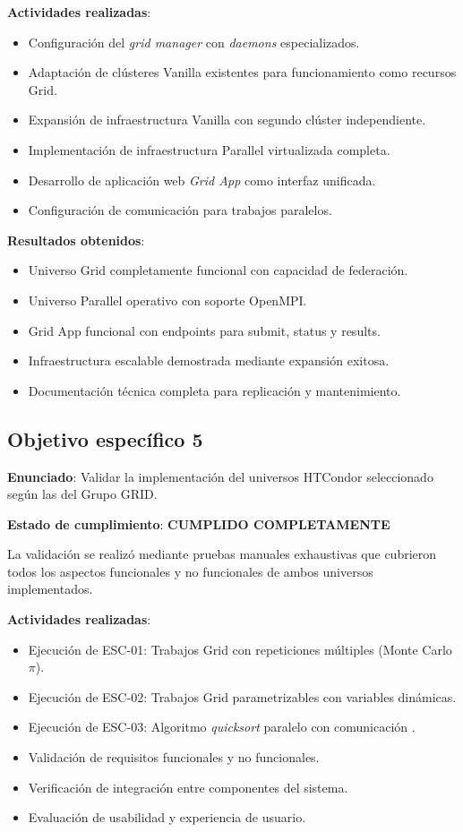 \textbf{Actividades realizadas}:
\begin{itemize}
    \item Configuración del \textit{grid manager} con \textit{daemons} especializados.
    \item Adaptación de clústeres Vanilla existentes para funcionamiento como recursos Grid.
    \item Expansión de infraestructura Vanilla con segundo clúster independiente.
    \item Implementación de infraestructura Parallel virtualizada completa.
    \item Desarrollo de aplicación web \textit{Grid App} como interfaz unificada.
    \item Configuración de comunicación \MPI para trabajos paralelos.
\end{itemize}

\textbf{Resultados obtenidos}:
\begin{itemize}
    \item Universo Grid completamente funcional con capacidad de federación.
    \item Universo Parallel operativo con soporte OpenMPI.
    \item Grid App funcional con endpoints para submit, status y results.
    \item Infraestructura escalable demostrada mediante expansión exitosa.
    \item Documentación técnica completa para replicación y mantenimiento.
\end{itemize}

\subsection{Objetivo específico 5}
\noindent

\textbf{Enunciado}: Validar la implementación del universos HTCondor seleccionado según las \NPO del Grupo GRID.

\textbf{Estado de cumplimiento}: \textbf{CUMPLIDO COMPLETAMENTE}

La validación se realizó mediante pruebas manuales exhaustivas que cubrieron todos los aspectos funcionales y no funcionales de ambos universos implementados.

\textbf{Actividades realizadas}:
\begin{itemize}
    \item Ejecución de ESC-01: Trabajos Grid con repeticiones múltiples (Monte Carlo $\pi$).
    \item Ejecución de ESC-02: Trabajos Grid parametrizables con variables dinámicas.
    \item Ejecución de ESC-03: Algoritmo \textit{quicksort} paralelo con comunicación \MPI.
    \item Validación de requisitos funcionales y no funcionales.
    \item Verificación de integración entre componentes del sistema.
    \item Evaluación de usabilidad y experiencia de usuario.
\end{itemize}

